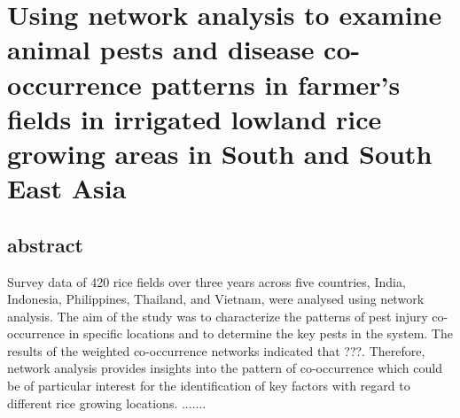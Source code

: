 \section{Using network analysis to examine animal pests and disease co-occurrence patterns in farmer's fields in irrigated lowland rice growing areas in South and South East Asia}


\subsection{abstract}
Survey data of 420 rice fields over three years across five countries, India, Indonesia, Philippines, Thailand, and Vietnam, were analysed using network analysis. The aim of the study was to characterize the patterns of pest injury co-occurrence in specific locations and to determine the key pests in the system. The results of the weighted co-occurrence networks indicated that ???. Therefore, network analysis provides insights into the pattern of co-occurrence  which could be of particular interest for the identification of key factors with regard to different rice growing locations. .......
